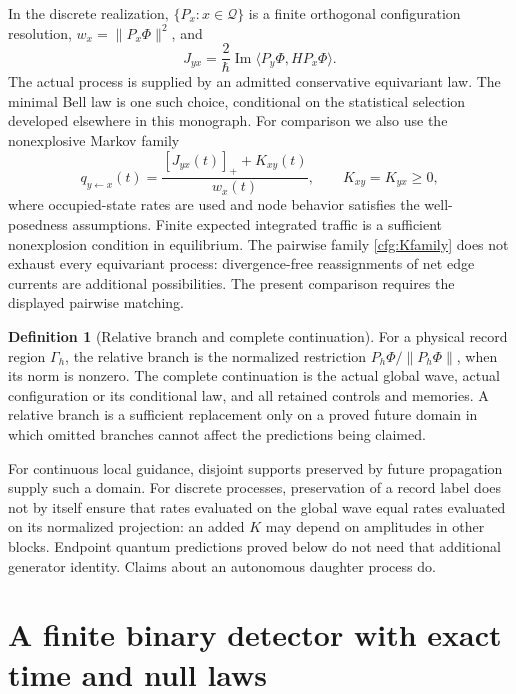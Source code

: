 \documentclass[11pt,oneside,openany]{book}
\theoremstyle{definition}
\newtheorem{definition}[theorem]{Definition}
\theoremstyle{remark}\newtheorem{remark}[theorem]{Remark}
\begin{document}
In the discrete realization, $\{P_x:x\in\mathcal Q\}$ is a finite
orthogonal configuration resolution, $w_x=\|P_x\Phi\|^2$, and
\[
 J_{yx}=\frac2\hbar\operatorname{Im}
          \langle P_y\Phi,H P_x\Phi\rangle.
\]
The actual process is supplied by an admitted conservative equivariant law.
The minimal Bell law is one such choice, conditional on the statistical
selection developed elsewhere in this monograph. For comparison we also use
the nonexplosive Markov family
\begin{equation}
 q_{y\leftarrow x}(t)=\frac{[J_{yx}(t)]_++K_{xy}(t)}{w_x(t)},
 \qquad K_{xy}=K_{yx}\ge0,
 \label{cfg:Kfamily}
\end{equation}
where occupied-state rates are used and node behavior satisfies the
well-posedness assumptions. Finite expected integrated traffic is a sufficient
nonexplosion condition in equilibrium. The pairwise family
\eqref{cfg:Kfamily} does not exhaust every equivariant process: divergence-free
reassignments of net edge currents are additional possibilities. The present
comparison requires the displayed pairwise matching.

\begin{definition}[Relative branch and complete continuation]
For a physical record region $\Gamma_h$, the relative branch is the normalized
restriction $P_h\Phi/\|P_h\Phi\|$, when its norm is nonzero. The complete
continuation is the actual global wave, actual configuration or its conditional
law, and all retained controls and memories. A relative branch is a sufficient
replacement only on a proved future domain in which omitted branches cannot
affect the predictions being claimed.
\end{definition}

For continuous local guidance, disjoint supports preserved by future
propagation supply such a domain. For discrete processes, preservation of a
record label does not by itself ensure that rates evaluated on the global wave
equal rates evaluated on its normalized projection: an added $K$ may depend
on amplitudes in other blocks. Endpoint quantum predictions proved below do
not need that additional generator identity. Claims about an autonomous
daughter process do.

\section{A finite binary detector with exact time and null laws}
\end{document}
